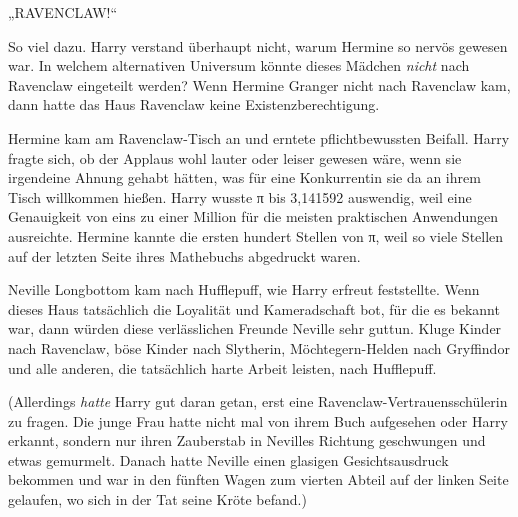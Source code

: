 „RAVENCLAW!“

So viel dazu. Harry verstand überhaupt nicht, warum Hermine so nervös gewesen war. In welchem alternativen Universum könnte dieses Mädchen \emph{nicht} nach Ravenclaw eingeteilt werden? Wenn Hermine Granger nicht nach Ravenclaw kam, dann hatte das Haus Ravenclaw keine Existenzberechtigung.

Hermine kam am Ravenclaw-Tisch an und erntete pflichtbewussten Beifall. Harry fragte sich, ob der Applaus wohl lauter oder leiser gewesen wäre, wenn sie irgendeine Ahnung gehabt hätten, was für eine Konkurrentin sie da an ihrem Tisch willkommen hießen. Harry wusste π bis 3,141592 auswendig, weil eine Genauigkeit von eins zu einer Million für die meisten praktischen Anwendungen ausreichte. Hermine kannte die ersten hundert Stellen von π, weil so viele Stellen auf der letzten Seite ihres Mathebuchs abgedruckt waren.

Neville Longbottom kam nach Hufflepuff, wie Harry erfreut feststellte. Wenn dieses Haus tatsächlich die Loyalität und Kameradschaft bot, für die es bekannt war, dann würden diese verlässlichen Freunde Neville sehr guttun. Kluge Kinder nach Ravenclaw, böse Kinder nach Slytherin, Möchtegern-Helden nach Gryffindor und alle anderen, die tatsächlich harte Arbeit leisten, nach Hufflepuff.

(Allerdings \emph{hatte} Harry gut daran getan, erst eine Ravenclaw-Vertrauensschülerin zu fragen. Die junge Frau hatte nicht mal von ihrem Buch aufgesehen oder Harry erkannt, sondern nur ihren Zauberstab in Nevilles Richtung geschwungen und etwas gemurmelt. Danach hatte Neville einen glasigen Gesichtsausdruck bekommen und war in den fünften Wagen zum vierten Abteil auf der linken Seite gelaufen, wo sich in der Tat seine Kröte befand.)

